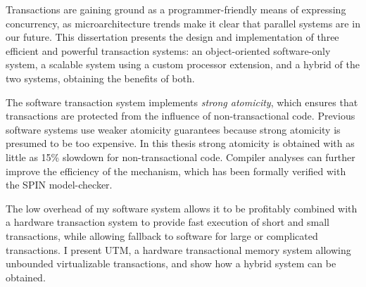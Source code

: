 {\small

Transactions are gaining ground as a programmer-friendly means of
expressing concurrency, as microarchitecture trends make it
clear that parallel systems are in our future.  This dissertation
presents the design and implementation of three efficient and powerful
transaction systems: an object-oriented software-only system, a
scalable system using a custom processor extension, and a hybrid of
the two systems, obtaining the benefits of both.

The software transaction system implements \textit{strong atomicity},
which ensures that transactions are protected from the influence of
non-transactional code.  Previous software systems use weaker
atomicity guarantees because strong atomicity is presumed to be too
expensive.  In this thesis strong atomicity is obtained with as little
as 15\% slowdown for non-transactional code.  Compiler analyses can
further improve the efficiency of the mechanism, which has been
formally verified with the SPIN model-checker.

The low overhead of my software system allows it to be profitably
combined with a hardware transaction system to provide fast execution
of short and small transactions, while allowing fallback to software
for large or complicated transactions.  I present UTM, a hardware
transactional memory system allowing unbounded virtualizable
transactions, and show how a hybrid system can be obtained.
}

